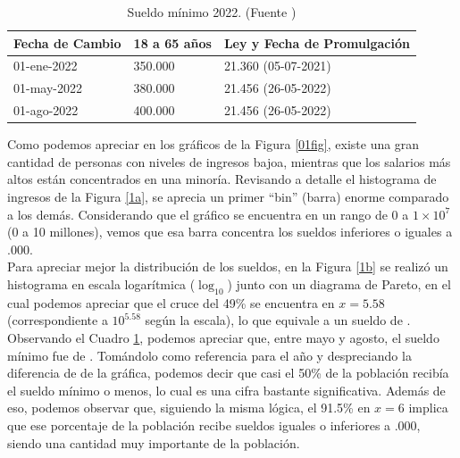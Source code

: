 \documentclass{article}
\begin{document}
	\begin{table}[htbp]
		\centering
		\begin{tabularx}{\textwidth}{|X|X|X|}
			\hline
			Fecha de Cambio & 18 a 65 años & Ley y Fecha de Promulgación\\
			\hline
			01-ene-2022 & 350.000 & 21.360 (05-07-2021) \\\hline
			01-may-2022 & 380.000 & 21.456 (26-05-2022) \\\hline
			01-ago-2022 & 400.000 & 21.456 (26-05-2022) \\\hline
		\end{tabularx}
		\caption{\label{tab} Sueldo mínimo 2022. (Fuente \cite{cyma})}
	\end{table}
		
	\FloatBarrier
	
	Como podemos apreciar en los gráficos de la Figura \ref{01fig}, existe una gran cantidad de personas con niveles de ingresos bajoa, mientras que los salarios más altos están concentrados en una minoría. Revisando a detalle el histograma de ingresos de la Figura \ref{1a}, se aprecia un primer “bin” (barra) enorme comparado a los demás. Considerando que el gráfico se encuentra en un rango de $0$ a $1\times10^{7}$ (0 a 10 millones), vemos que esa barra concentra los sueldos inferiores o iguales a .000.\\
	
	Para apreciar mejor la distribución de los sueldos, en la Figura \ref{1b} se realizó un histograma en escala logarítmica (\(\log_{10}\)) junto con un diagrama de Pareto, en el cual podemos apreciar que el cruce del 49\% se encuentra en $x=5.58$ (correspondiente a $10^{5.58}$ según la escala), lo que equivale a un sueldo de .\\
	
	Observando el Cuadro \ref{tab}, podemos apreciar que, entre mayo y agosto, el sueldo mínimo fue de . Tomándolo como referencia para el año y despreciando la diferencia de  de la gráfica, podemos decir que casi el 50\% de la población recibía el sueldo mínimo o menos, lo cual es una cifra bastante significativa. Además de eso, podemos observar que, siguiendo la misma lógica, el 91.5\% en $x=6$ implica que ese porcentaje de la población recibe sueldos iguales o inferiores a .000, siendo una cantidad muy importante de la población.
	
	\FloatBarrier
	
\end{document}
